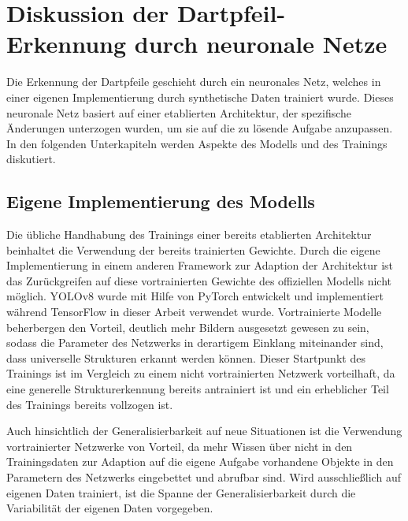 
\section{Diskussion der Dartpfeil-Erkennung durch neuronale Netze}
\label{sec:diskussion:ki}

Die Erkennung der Dartpfeile geschieht durch ein neuronales Netz, welches in einer eigenen Implementierung durch synthetische Daten trainiert wurde. Dieses neuronale Netz basiert auf einer etablierten Architektur, der spezifische Änderungen unterzogen wurden, um sie auf die zu lösende Aufgabe anzupassen. In den folgenden Unterkapiteln werden Aspekte des Modells und des Trainings diskutiert.

\subsection{Eigene Implementierung des Modells}

Die übliche Handhabung des Trainings einer bereits etablierten Architektur beinhaltet die Verwendung der bereits trainierten Gewichte. Durch die eigene Implementierung in einem anderen Framework zur Adaption der Architektur ist das Zurückgreifen auf diese vortrainierten Gewichte des offiziellen Modells nicht möglich. YOLOv8 wurde mit Hilfe von PyTorch entwickelt und implementiert während TensorFlow in dieser Arbeit verwendet wurde. Vortrainierte Modelle beherbergen den Vorteil, deutlich mehr Bildern ausgesetzt gewesen zu sein, sodass die Parameter des Netzwerks in derartigem Einklang miteinander sind, dass universelle Strukturen erkannt werden können. Dieser Startpunkt des Trainings ist im Vergleich zu einem nicht vortrainierten Netzwerk vorteilhaft, da eine generelle Strukturerkennung bereits antrainiert ist und ein erheblicher Teil des Trainings bereits vollzogen ist.

Auch hinsichtlich der Generalisierbarkeit auf neue Situationen ist die Verwendung vortrainierter Netzwerke von Vorteil, da mehr Wissen über nicht in den Trainingsdaten zur Adaption auf die eigene Aufgabe vorhandene Objekte in den Parametern des Netzwerks eingebettet und abrufbar sind. Wird ausschließlich auf eigenen Daten trainiert, ist die Spanne der Generalisierbarkeit durch die Variabilität der eigenen Daten vorgegeben.


